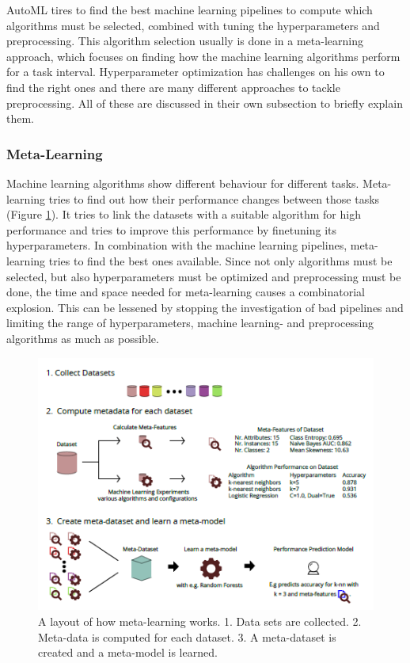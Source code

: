 \documentclass[10pt,a4paper]{article}
\begin{document}
	AutoML tires to find the best machine learning pipelines to compute which algorithms must be selected, combined with tuning the hyperparameters and preprocessing. This algorithm selection usually is done in a meta-learning approach, which focuses on finding how the machine learning algorithms perform for a task interval. Hyperparameter optimization has challenges on his own to find the right ones and there are many different approaches to tackle preprocessing. All of these are discussed in their own subsection to briefly explain them.	
	
	
	\subsubsection{Meta-Learning}
	\label{subsubsec:Meta-Learning}
	
	Machine learning algorithms show different behaviour for different tasks. Meta-learning tries to find out how their performance changes between those tasks (Figure \ref{fig:Meta-LearningLayout}). It tries to link the datasets with a suitable algorithm for high performance and tries to improve this performance by finetuning its hyperparameters. In combination with the machine learning pipelines, meta-learning tries to find the best ones available. Since not only algorithms must be selected, but also hyperparameters must be optimized and preprocessing must be done, the time and space needed for meta-learning causes a combinatorial explosion. This can be lessened by stopping the investigation of bad pipelines and limiting the range of hyperparameters, machine learning- and preprocessing algorithms as much as possible. 

	\begin{figure}
		\label{fig:Meta-LearningLayout}
		\includegraphics[scale=1]{Meta-LearningLayout.png}
		\caption{A layout of how meta-learning works. 1. Data sets are collected. 2. Meta-data is computed for each dataset. 3. A meta-dataset is created and a meta-model is learned. \cite{Gijsbers2017Thesis}}
	\end{figure}
	
\end{document}

